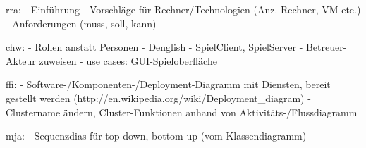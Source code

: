 rra:
- Einführung
- Vorschläge für Rechner/Technologien (Anz. Rechner, VM etc.)
- Anforderungen (muss, soll, kann)

chw:
- Rollen anstatt Personen
- Denglish
- SpielClient, SpielServer
- Betreuer-Akteur zuweisen
- use cases: GUI-Spieloberfläche

ffi:
- Software-/Komponenten-/Deployment-Diagramm mit Diensten, bereit gestellt werden (http://en.wikipedia.org/wiki/Deployment_diagram)
- Clustername ändern, Cluster-Funktionen anhand von Aktivitäts-/Flussdiagramm

mja:
- Sequenzdias für top-down, bottom-up (vom Klassendiagramm)
